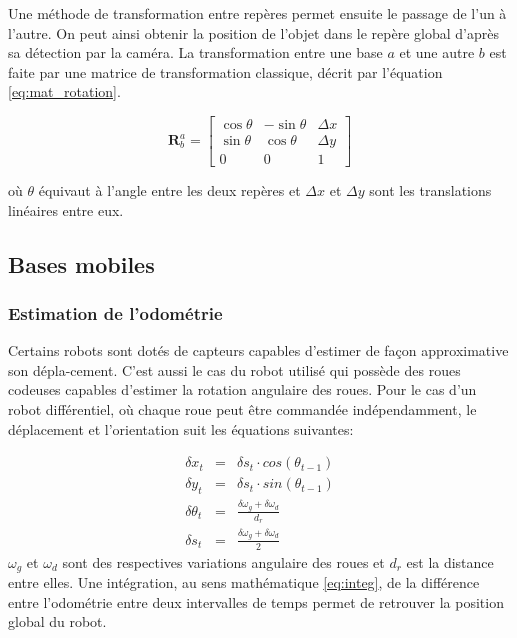 Une méthode de transformation entre repères permet ensuite le passage de l'un à l'autre. On peut ainsi obtenir la position de l'objet  dans le repère global d'après sa détection par la caméra. La transformation entre une base $a$ et une autre $b$ est faite par une matrice de transformation classique, décrit par l'équation \ref{eq:mat_rotation}. 

\begin{equation}
	\mathbf{R}^{a}_{b} = 
	\begin{bmatrix} 
	 	\cos \theta &  -\sin \theta & \Delta x \\ \sin \theta & \cos \theta & \Delta y \\ 0 & 0 & 1
	 \end{bmatrix}
	\label{eq:mat_rotation}
\end{equation}

où $\theta$ équivaut à l'angle entre les deux repères et $\Delta x$ et $\Delta y$ sont les translations linéaires entre eux.

\subsection{Bases mobiles}

\subsubsection{Estimation de l'odométrie}

Certains robots sont dotés de capteurs capables d'estimer de façon
approximative son dépla-cement. C'est aussi le cas du robot utilisé qui
possède des roues codeuses capables d'estimer la rotation angulaire des
roues. Pour le cas d'un robot différentiel, où chaque roue peut être
commandée indépendamment, le déplacement et l'orientation suit les équations suivantes:

\begin{equation}
	\begin{array}{rcl}
		\delta x_t &=& \delta s_t \cdot cos(\theta_{t-1}) \\
		\delta y_t &=& \delta s_t \cdot sin(\theta_{t-1}) \\
		\delta \theta_t &=& \frac{\delta \omega_{g} + \delta \omega_{d}}{d_{r}}\\
		\delta s_t &=& \frac{\delta \omega_{g} + \delta \omega_{d}}{2}						
	\end{array}
\end{equation}
$\omega_g$ et $\omega_d$ sont des respectives variations angulaire des roues et $d_r$ est la distance entre elles. Une intégration, au sens mathématique \ref{eq:integ}, de la différence entre
l'odométrie entre deux intervalles de temps permet de retrouver la position global du robot.

